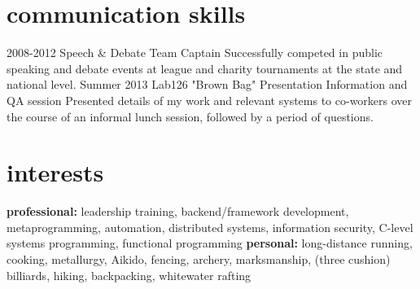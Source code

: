 \documentclass[]{mills-cv} %
\begin{document}
\section{communication skills}

\begin{entrylist}
\entry
{2008-2012}
{Speech \& Debate}
{Team Captain}
{Successfully competed in public speaking and debate events at league and charity tournaments at the state and national level.}
\entry
{Summer 2013}
{Lab126 "Brown Bag" Presentation}
{Information and QA session}
{Presented details of my work and relevant systems to co-workers over the course of an informal lunch session, followed by a period of questions.}
\end{entrylist}


\section{interests}

\textbf{professional:} leadership training, backend/framework development, metaprogramming, automation, distributed systems, information security, C-level systems programming, functional programming \textbf{personal:} long-distance running, cooking, metallurgy, Aikido, fencing, archery, marksmanship, (three cushion) billiards, hiking, backpacking, whitewater rafting
\end{document}
